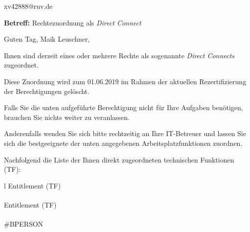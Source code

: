 \documentclass[a4paper,landscape,12pt]{letter}
\begin{document}
\begin{letter}{xv42888@ruv.de\hfill \break}
\begin{normalsize}
	\opening{\textbf{Betreff:} Rechtezuordnung als \emph{Direct Connect}}
	\begin{normalsize} \hfill
	\end{normalsize}

	\begin{normalsize}
		Guten Tag, 
	Maik Leuschner, \hfill \break
	\end{normalsize}
	\end{normalsize}
	
\begin{normalsize}
	Ihnen sind derzeit eines oder mehrere Rechte als sogenannte \emph{Direct Connects} zugeordnet.
	
	Diese Zuordnung wird zum 01.06.2019 im Rahmen der aktuellen Rezertifizierung der Berechtigungen gelöscht.
	
	Falls Sie die unten aufgeführte Berechtigung nicht für Ihre Aufgaben benötigen, 
	brauchen Sie nichts weiter zu veranlassen.
	
	Anderenfalls wenden Sie sich bitte rechtzeitig an Ihre IT-Betreuer 
	und lassen Sie sich die bestgeeignete der unten angegebenen Arbeitsplatzfunktionen zuordnen.
	\end{normalsize}
	
\begin{normalsize}
	Nachfolgend die Liste der Ihnen direkt zugeordneten technischen Funktionen (TF):

	\begin{longtable}{l}
		Entitlement (TF) \\ \hline
		\endfirsthead
		\\\hline
		Entitlement (TF) \\ \hline
		\endhead %
		\multicolumn{1}{r@{}}{Fortsetzung \ldots}\\
		\endfoot
		\hline
		\endlastfoot
	\#BPERSON\\
	\end{longtable}
	\end{normalsize}
	

\end{letter}
\end{document}
